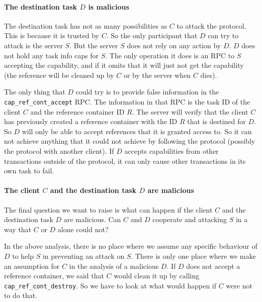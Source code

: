 \paragraph{The destination task $D$ is malicious}

The destination task has not as many possibilities as $C$ to attack
the protocol.  This is because it is trusted by $C$.  So the only
participant that $D$ can try to attack is the server $S$.  But the
server $S$ does not rely on any action by $D$.  $D$ does not hold any
task info caps for $S$.  The only operation it does is an RPC to $S$
accepting the capability, and if it omits that it will just not get
the capability (the reference will be cleaned up by $C$ or by the
server when $C$ dies).

The only thing that $D$ could try is to provide false information in
the \verb/cap_ref_cont_accept/ RPC.  The information in that RPC is
the task ID of the client $C$ and the reference container ID $R$.  The
server will verify that the client $C$ has previously created a
reference container with the ID $R$ that is destined for $D$.  So $D$
will only be able to accept references that it is granted access to.
So it can not achieve anything that it could not achieve by following
the protocol (possibly the protocol with another client).  If $D$
accepts capabilities from other transactions outside of the protocol,
it can only cause other transactions in its own task to fail.

\begin{comment}
  If you can do something wrong and harm yourself that way, then this
  is called ``shooting yourself in your foot''.
  
  The destination task $D$ is welcome to shoot itself in its foot.
\end{comment}

\paragraph{The client $C$ and the destination task $D$ are malicious}

The final question we want to raise is what can happen if the client
$C$ and the destination task $D$ are malicious.  Can $C$ and $D$
cooperate and attacking $S$ in a way that $C$ or $D$ alone could not?

In the above analysis, there is no place where we assume any specific
behaviour of $D$ to help $S$ in preventing an attack on $S$.  There is
only one place where we make an assumption for $C$ in the analysis of
a malicious $D$.  If $D$ does not accept a reference container, we
said that $C$ would clean it up by calling
\verb/cap_ref_cont_destroy/.  So we have to look at what would happen
if $C$ were not to do that.


